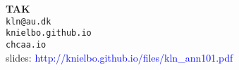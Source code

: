 \begin{frame}
	\begin{center}
		\textbf{TAK}\\
			\medskip
		\texttt{kln@au.dk\\knielbo.github.io}\\
		\texttt{chcaa.io}\\
			\medskip
		slides: \textcolor{blue}{http://knielbo.github.io/files/kln\_ann101.pdf}\\
	\end{center}
\end{frame}
